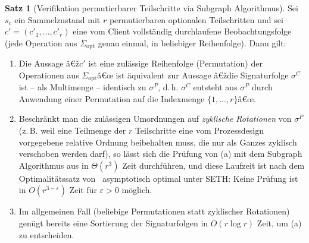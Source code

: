 ﻿\documentclass[a4paper,12pt]{article}
\theoremstyle{definition}
\newtheorem{satz}{Satz}
\begin{document}
\begin{satz}[Verifikation permutierbarer Teilschritte via Subgraph Algorithmus]
	\label{satz:permutierbar-subgraph}
	Sei $s_c$ ein Sammelzustand mit $r$ permutierbaren optionalen Teilschritten und sei
	$c'=(c'_1,\ldots,c'_r)$ eine vom Client vollständig durchlaufene Beobachtungsfolge
	(jede Operation aus $\Sigma_{\mathrm{opt}}$ genau einmal, in beliebiger Reihenfolge).
	Dann gilt:
	\begin{enumerate}
		\item[(a)] Die Aussage â€ž$c'$ ist eine zulässige Reihenfolge (Permutation) der
		      Operationen aus $\Sigma_{\mathrm{opt}}$â€œ ist äquivalent zur Aussage â€ždie
		      Signaturfolge $\sigma^{C}$ ist -- als Multimenge -- identisch zu
		      $\sigma^{P}$, d.\,h. $\sigma^{C}$ entsteht aus $\sigma^{P}$ durch
		      Anwendung einer Permutation auf die Indexmenge $\{1,\ldots,r\}$â€œ.
		\item[(b)] Beschränkt man die zulässigen Umordnungen auf \emph{zyklische
		      Rotationen} von $\sigma^{P}$ (z.\,B. weil eine Teilmenge der $r$
		      Teilschritte eine vom Prozessdesign vorgegebene relative Ordnung
		      beibehalten muss, die nur als Ganzes zyklisch verschoben werden darf), so
		      lässt sich die Prüfung von (a) mit dem Subgraph Algorithmus aus
		      \cite{epp2026subgraph} in $\Theta(r^3)$ Zeit durchführen, und diese
		      Laufzeit ist nach dem Optimalitätssatz von~\cite{epp2026subgraph}
		      asymptotisch optimal unter SETH: Keine Prüfung ist in
		      $O(r^{3-\varepsilon})$ Zeit für $\varepsilon>0$ möglich.
		\item[(c)] Im allgemeinen Fall (beliebige Permutationen statt zyklischer
		      Rotationen) genügt bereits eine Sortierung der Signaturfolgen in
		      $O(r \log r)$ Zeit, um (a) zu entscheiden.
	\end{enumerate}
\end{satz}
\end{document}
